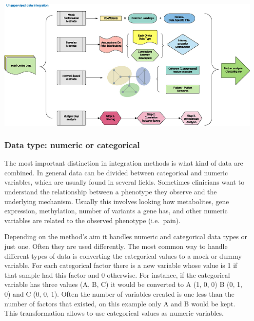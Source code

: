 \documentclass[
  12pt,
  a4paper,
  twoside,
  openright]{book}
\let\origfigure\figure
\let\endorigfigure\endfigure
\renewenvironment{figure}[1][2] {
    \expandafter\origfigure\expandafter[!htbp]
} {
    \endorigfigure
}
\begin{document}
\begin{figure}
\includegraphics[width=1\linewidth]{images/figure1_huang2017} \caption[Unsupervised data integration methodology.]{Unsupervised data integration methodology. Adapted from figure 1 from Huang 2017.}\label{fig:classification}
\end{figure}

\hypertarget{data-type-numeric-or-categorical}{%
\subsubsection{Data type: numeric or categorical}\label{data-type-numeric-or-categorical}}

The most important distinction in integration methods is what kind of data are combined.
In general data can be divided between categorical and numeric variables, which are usually found in several fields.
Sometimes clinicians want to understand the relationship between a phenotype they observe and the underlying mechanism.
Usually this involves looking how metabolites, gene expression, methylation, number of variants a gene has, and other numeric variables are related to the observed phenotype (i.e.~pain).

Depending on the method's aim it handles numeric and categorical data types or just one.
Often they are used differently.
The most common way to handle different types of data is converting the categorical values to a mock or dummy variable.
For each categorical factor there is a new variable whose value is 1 if that sample had this factor and 0 otherwise.
For instance, if the categorical variable has three values (A, B, C) it would be converted to A (1, 0, 0) B (0, 1, 0) and C (0, 0, 1).
Often the number of variables created is one less than the number of factors that existed, on this example only A and B would be kept.
This transformation allows to use categorical values as numeric variables.
\end{document}
